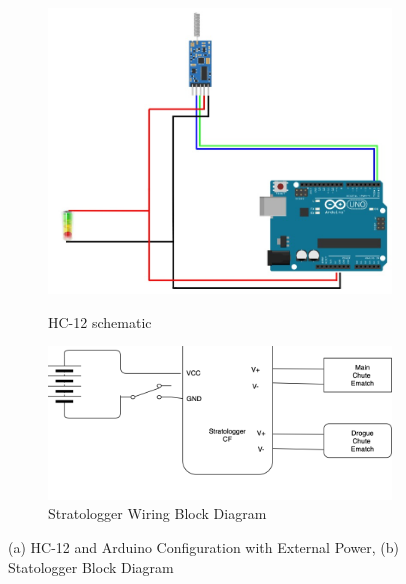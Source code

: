 \begin{figure}[H]
    \begin{subfigure}[b]{.49\linewidth}
        \centering
        \includegraphics[width=\linewidth]{img/AV/HC12.jpg}
        \label{HC-12schematics}
        \caption{HC-12 schematic}
    \end{subfigure}
    \begin{subfigure}[b]{.49\linewidth}
        \centering
        \includegraphics[width=\linewidth]{img/AV/StratoLogger.png}
        \caption{Stratologger Wiring Block Diagram}
    \end{subfigure}
    \caption{(a) HC-12 and Arduino Configuration with External Power, (b) Statologger Block Diagram}
\end{figure}


